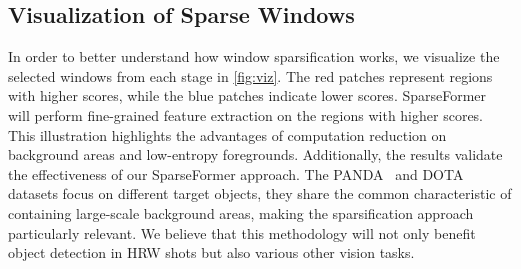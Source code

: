 \subsection{Visualization of Sparse Windows}

In order to better understand how window sparsification works, we visualize the selected windows from each stage in \cref{fig:viz}. The red patches represent regions with higher scores, while the blue patches indicate lower scores. SparseFormer will perform fine-grained feature extraction on the regions with higher scores. This illustration highlights the advantages of computation reduction on background areas and low-entropy foregrounds. Additionally, the results validate the effectiveness of our SparseFormer approach. 
The PANDA~\cite{wang2020panda} and DOTA~\cite{xia2018dota} datasets focus on different target objects, they share the common characteristic of containing large-scale background areas, making the sparsification approach particularly relevant. We believe that this methodology will not only benefit object detection in HRW shots but also various other vision tasks.

